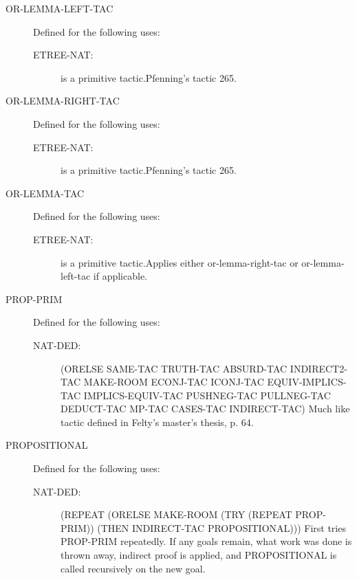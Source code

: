 \begin{description}
\begin{description}
\end{description}

\item[OR-LEMMA-LEFT-TAC]  Defined for the following uses:
\begin{description}
\item[ETREE-NAT:]  is a primitive tactic.Pfenning's tactic 265.

\end{description}

\item[OR-LEMMA-RIGHT-TAC]  Defined for the following uses:
\begin{description}
\item[ETREE-NAT:]  is a primitive tactic.Pfenning's tactic 265.

\end{description}

\item[OR-LEMMA-TAC]  Defined for the following uses:
\begin{description}
\item[ETREE-NAT:]  is a primitive tactic.Applies either or-lemma-right-tac or or-lemma-left-tac if applicable.

\end{description}

\item[PROP-PRIM]  Defined for the following uses:
\begin{description}
\item[NAT-DED:] 
(ORELSE SAME-TAC TRUTH-TAC ABSURD-TAC INDIRECT2-TAC MAKE-ROOM ECONJ-TAC
 ICONJ-TAC EQUIV-IMPLICS-TAC IMPLICS-EQUIV-TAC PUSHNEG-TAC PULLNEG-TAC
 DEDUCT-TAC MP-TAC CASES-TAC INDIRECT-TAC)
Much like tactic defined in Felty's master's thesis, p. 64.

\end{description}

\item[PROPOSITIONAL]  Defined for the following uses:
\begin{description}
\item[NAT-DED:] 
(REPEAT
 (ORELSE MAKE-ROOM (TRY (REPEAT PROP-PRIM))
  (THEN INDIRECT-TAC PROPOSITIONAL)))
First tries PROP-PRIM repeatedly.  If any goals remain, what work
was done is thrown away, indirect proof is applied, and PROPOSITIONAL
is called recursively on the new goal.


\end{description}
\end{description}
